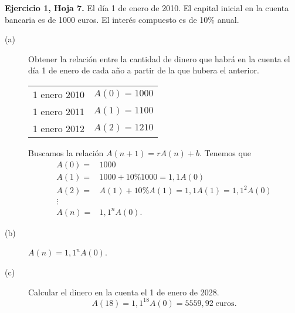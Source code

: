 \begin{eg}
\normalfont \textbf{Ejercicio 1, Hoja 7.} El día 1 de enero de 2010. El capital inicial en la cuenta bancaria es de 1000 euros. El interés compuesto es de 10\% anual. 
\begin{description}
\item[(a)] Obtener la relación entre la cantidad de dinero que habrá en la cuenta el día 1 de enero de cada año a partir de la que hubera el anterior.
	\begin{center}
	\begin{tabular}{c c}
		1 enero 2010 & $\displaystyle A\left(0\right) = 1000 $ \\
		1 enero 2011 & $\displaystyle A\left(1\right) = 1100 $ \\
		1 enero 2012 & $\displaystyle A\left(2\right) = 1210 $ 
	\end{tabular}
	\end{center}
	Buscamos la relación $\displaystyle A\left(n+1\right) = rA\left(n\right) + b$. Tenemos que 
	\[
	\begin{split}
		A\left(0\right) = & 1000 \\
		A\left(1\right) = & 1000 + 10\% 1000 = 1,1 A\left(0\right) \\
		A\left(2\right) = & A\left(1\right) + 10\% A\left(1\right) = 1,1A\left(1\right)=1,1^{2}A\left(0\right) \\
		\vdots \\
		A\left(n\right) = & 1,1^{n}A\left(0\right).
	\end{split}
	\]
\item[(b)] $\displaystyle A\left(n\right) = 1,1^{n}A\left(0\right) $.
\item[(c)] Calcular el dinero en la cuenta el 1 de enero de 2028.
	\[A\left(18\right) = 1,1^{18}A\left(0\right) = 5559,92 \; \text{euros} .\]	
\end{description}
\end{eg}
